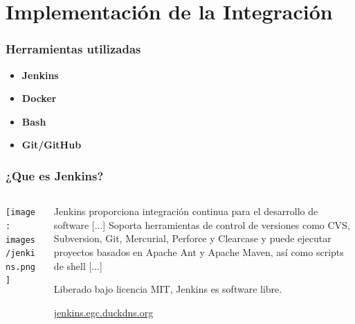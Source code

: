 \documentclass[
xcolor={svgnames},
hyperref={colorlinks,citecolor=DeepPink4,linkcolor=Black,urlcolor=DarkBlue}
]{beamer}
\begin{document}
\section{Implementación de la Integración}

\begin{frame}
	\frametitle{Herramientas utilizadas}
	\begin{itemize}
		\item \textbf{Jenkins}
		\item \textbf{Docker} 
		\item \textbf{Bash}
		\item \textbf{Git/GitHub}
	\end{itemize}

\end{frame}



\begin{frame}
	\frametitle{¿Que es Jenkins?}
	\begin{columns}[t]
	    \begin{column}{0.2\textwidth}
	    	\begin{center}
				\texttt{[image: images/jenkins.png]}
			\end{center}
		\end{column}
		\begin{column}{0.7\textwidth}
			\begin{block}{}
				Jenkins proporciona integración continua para el desarrollo de software [...] Soporta herramientas de control de versiones como CVS, Subversion, Git, Mercurial, Perforce y Clearcase y puede ejecutar proyectos basados en Apache Ant y Apache Maven, así como scripts de shell [...]
				
				Liberado bajo licencia MIT, Jenkins es software libre.
				\nocite{wiki:jenkins}
			\end{block}
			\begin{center}
				\href{https://jenkins.egc.duckdns.org}{jenkins.egc.duckdns.org}
			\end{center}
		\end{column}
	\end{columns}	    
	
\end{frame}

\end{document}
